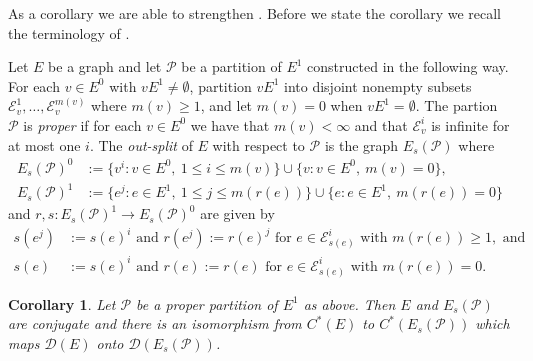 \documentclass[12pt, a4paper]{amsart}
\numberwithin{equation}{section}
\newtheorem{cor}[thm]{Corollary}
\theoremstyle{definition}
\theoremstyle{remark}
\begin{document}
As a corollary we are able to strengthen \cite[Theorem 3.2]{BP}. Before we state the corollary we recall the terminology of \cite{BP}.

Let $E$ be a graph and let $\mathcal{P}$ be a partition of $E^1$ constructed 
in the following way. For each $v\in E^0$ with $vE^1\ne\emptyset$, partition 
$vE^1$ into disjoint nonempty subsets 
$\mathcal{E}_v^1,\dots,\mathcal{E}_v^{m(v)}$ where $m(v)\ge 1$, and let 
$m(v)=0$ when $vE^1=\emptyset$. The partion $\mathcal{P}$ is \emph{proper} if 
for each $v\in E^0$ we have that $m(v)<\infty$ and that $\mathcal{E}_v^i$ is 
infinite for at most one $i$. The \emph{out-split} of $E$ with respect to 
$\mathcal{P}$ is the graph $E_s(\mathcal{P})$ where
\begin{align*}
	E_s(\mathcal{P})^0&:=\{v^i:v\in E^0,\ 1\le i\le m(v)\}\cup\{v:v\in E^0,\ m(v)=0\},\\
	E_s(\mathcal{P})^1&:=\{e^j:e\in E^1,\ 1\le j\le m(r(e))\}\cup\{e:e\in E^1,\ m(r(e))=0\}
\end{align*} 
and $r,s:E_s(\mathcal{P})^1\to E_s(\mathcal{P})^0$ are given by
\begin{align*}
	s(e^j)&:=s(e)^i\text{ and }r(e^j):=r(e)^j\text{ for }e\in\mathcal{E}_{s(e)}^i\text{ with }m(r(e))\ge 1,\text{ and}\\
	s(e)&:=s(e)^i\text{ and }r(e):=r(e)\text{ for }e\in\mathcal{E}_{s(e)}^i\text{ with }m(r(e))=0.
\end{align*}

\begin{cor}
	Let $\mathcal{P}$ be a proper partition of $E^1$ as above. Then $E$ and $E_s(\mathcal{P})$ are conjugate and there is an isomorphism from $C^*(E)$ to $C^*(E_s(\mathcal{P}))$ which maps $\mathcal{D}(E)$ onto $\mathcal{D}(E_s(\mathcal{P}))$.
\end{cor}
\end{document}
